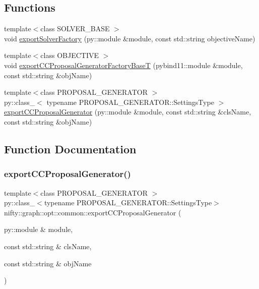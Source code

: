 \subsection*{Functions}
\begin{DoxyCompactItemize}
\item 
{\footnotesize template$<$class S\+O\+L\+V\+E\+R\+\_\+\+B\+A\+SE $>$ }\\void \hyperlink{namespacenifty_1_1graph_1_1opt_1_1common_a9157c21e054d13b6f906f603d4586d19}{export\+Solver\+Factory} (py\+::module \&module, const std\+::string objective\+Name)
\item 
{\footnotesize template$<$class O\+B\+J\+E\+C\+T\+I\+VE $>$ }\\void \hyperlink{namespacenifty_1_1graph_1_1opt_1_1common_a46bc285457ae673b92158784d4fe6dff}{export\+C\+C\+Proposal\+Generator\+Factory\+BaseT} (pybind11\+::module \&module, const std\+::string \&obj\+Name)
\item 
{\footnotesize template$<$class P\+R\+O\+P\+O\+S\+A\+L\+\_\+\+G\+E\+N\+E\+R\+A\+T\+OR $>$ }\\py\+::class\+\_\+$<$ typename P\+R\+O\+P\+O\+S\+A\+L\+\_\+\+G\+E\+N\+E\+R\+A\+T\+O\+R\+::\+Settings\+Type $>$ \hyperlink{namespacenifty_1_1graph_1_1opt_1_1common_ac94bdc128962d8838e9f73b74c3db691}{export\+C\+C\+Proposal\+Generator} (py\+::module \&module, const std\+::string \&cls\+Name, const std\+::string \&obj\+Name)
\end{DoxyCompactItemize}


\subsection{Function Documentation}
\mbox{\label{namespacenifty_1_1graph_1_1opt_1_1common_ac94bdc128962d8838e9f73b74c3db691}} 
\subsubsection{\texorpdfstring{export\+C\+C\+Proposal\+Generator()}{exportCCProposalGenerator()}}
{\footnotesize\ttfamily template$<$class P\+R\+O\+P\+O\+S\+A\+L\+\_\+\+G\+E\+N\+E\+R\+A\+T\+OR $>$ \\
py\+::class\+\_\+$<$typename P\+R\+O\+P\+O\+S\+A\+L\+\_\+\+G\+E\+N\+E\+R\+A\+T\+O\+R\+::\+Settings\+Type$>$ nifty\+::graph\+::opt\+::common\+::export\+C\+C\+Proposal\+Generator (\begin{DoxyParamCaption}\item[{py\+::module \&}]{module,  }\item[{const std\+::string \&}]{cls\+Name,  }\item[{const std\+::string \&}]{obj\+Name }\end{DoxyParamCaption})}

